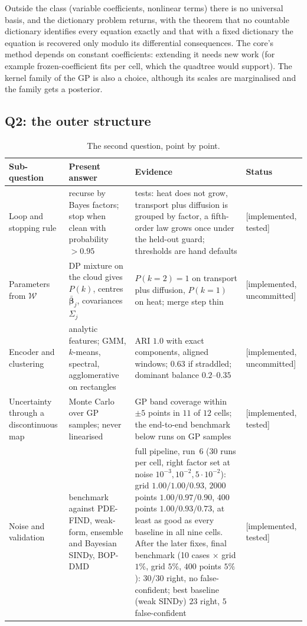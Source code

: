 \documentclass[11pt,a4paper]{article}
\theoremstyle{definition}
\newcommand{\badge}[2]{\textcolor{#1}{\textsf{\footnotesize[#2]}}}
\newcommand{\impl}{\badge{cC}{implemented, tested}}
\newcommand{\implu}{\badge{cD}{implemented, uncommitted}}
\newcommand{\bs}{\boldsymbol}
\begin{document}
\begin{caution}[title=Where the answer stops]
Outside the class (variable coefficients, nonlinear terms) there is no universal basis, and the dictionary problem returns, with the theorem that no countable dictionary identifies every equation exactly and that with a fixed dictionary the equation is recovered only modulo its differential consequences. The core's method depends on constant coefficients: extending it needs new work (for example frozen-coefficient fits per cell, which the quadtree would support). The kernel family of the GP is also a choice, although its scales are marginalised and the family gets a posterior.
\end{caution}

\subsection{Q2: the outer structure}
\begin{table}[!htb]
\centering\small
\begin{tabular}{@{}L{3.0cm}L{5.2cm}L{4.4cm}L{1.8cm}@{}}
\toprule
Sub-question & Present answer & Evidence & Status\\\midrule
Loop and stopping rule & recurse by Bayes factors; stop when clean with probability $>0.95$ & tests: heat does not grow, transport plus diffusion is grouped by factor, a fifth-order law grows once under the held-out guard; thresholds are hand defaults & \impl{}\\
Parameters from $\mathcal W$ & DP mixture on the cloud gives $P(k)$, centres $\bar{\bs\beta}_j$, covariances $\Sigma_j$ & $P(k=2)=1$ on transport plus diffusion, $P(k=1)$ on heat; merge step thin & \implu{}\\
Encoder and clustering & analytic features; GMM, $k$-means, spectral, agglomerative on rectangles & ARI $1.0$ with exact components, aligned windows; $0.63$ if straddled; dominant balance $0.2$--$0.35$ & \implu{}\\
Uncertainty through a discontinuous map & Monte Carlo over GP samples; never linearised & GP band coverage within $\pm5$ points in $11$ of $12$ cells; the end-to-end benchmark below runs on GP samples & \impl{}\\
Noise and validation & benchmark against PDE-FIND, weak-form, ensemble and Bayesian SINDy, BOP-DMD & full pipeline, run~6 (30 runs per cell, right factor set at noise $10^{-3},10^{-2},5\cdot10^{-2}$): grid $1.00/1.00/0.93$, $2000$ points $1.00/0.97/0.90$, $400$ points $1.00/0.93/0.73$, at least as good as every baseline in all nine cells. After the later fixes, final benchmark (10 cases $\times$ grid $1\%$, grid $5\%$, $400$ points $5\%$): $30/30$ right, no false-confident; best baseline (weak SINDy) $23$ right, $5$ false-confident & \impl{}\\
\bottomrule
\end{tabular}
\caption{The second question, point by point.}
\end{table}
\end{document}
